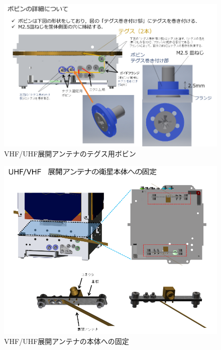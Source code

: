 \begin{figure}[H]
		\centering
		\includegraphics[scale=1]{03/fig/3-8-3.png}
	\caption{VHF/UHF展開アンテナのテグス用ボビン}
	\label{fig3-8-3}
\end{figure}
\begin{figure}[H]
		\centering
		\includegraphics[scale=1]{03/fig/3-8-4.png}
	\caption{VHF/UHF展開アンテナの本体への固定}
	\label{fig3-8-4}
\end{figure}

